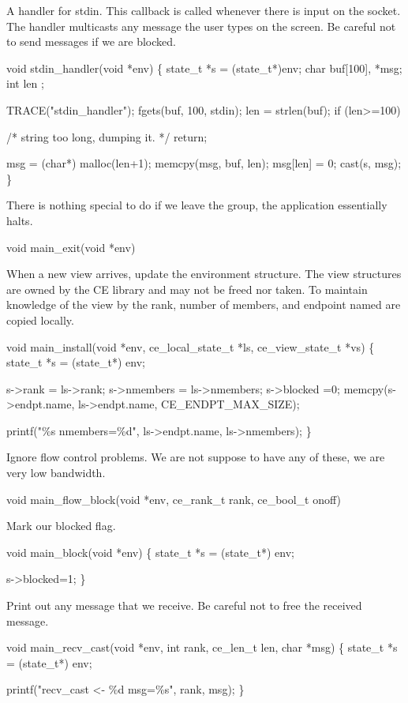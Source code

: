 A handler for stdin. This callback is called whenever there is input
on the socket. The handler multicasts any message the user types on the
screen. Be careful not to send messages if we are blocked.
\begin{codebox}
void
stdin_handler(void *env)
\{
    state_t *s = (state_t*)env;
    char buf[100], *msg;
    int len ;
    
    TRACE("stdin_handler");
    fgets(buf, 100, stdin);
    len = strlen(buf);
    if (len>=100)
    
    /* string too long, dumping it.
     */
    return;

    msg = (char*) malloc(len+1);
    memcpy(msg, buf, len);
    msg[len] = 0;
    cast(s, msg);
\}
\end{codebox}


There is nothing special to do if we leave the group, the application
essentially halts.
\begin{codebox}
void main_exit(void *env){}
\end{codebox}

When a new view arrives, update the environment structure. The view
structures are owned by the CE library and may not be freed nor taken. To
maintain knowledge of the view by the rank, number of members, and
endpoint named are copied locally. 
\begin{codebox}
void main_install(void *env, ce_local_state_t *ls, ce_view_state_t *vs) 
\{
    state_t *s = (state_t*) env;
    
    s->rank = ls->rank;
    s->nmembers = ls->nmembers;
    s->blocked =0;
    memcpy(s->endpt.name, ls->endpt.name, CE\_ENDPT\_MAX\_SIZE);

    printf("\%s nmembers=\%d", ls->endpt.name, ls->nmembers);
\}
\end{codebox}

Ignore flow control problems. We are not suppose to have any of 
these, we are very low bandwidth.
\begin{codebox}
void main_flow_block(void *env, ce_rank_t rank, ce_bool_t onoff){}
\end{codebox}

Mark our blocked flag. 
\begin{codebox}
void main_block(void *env) \{
  state_t *s = (state_t*) env;

  s->blocked=1;
\}
\end{codebox}

Print out any message that we receive. Be careful not to free the
received message.
\begin{codebox}
void main_recv_cast(void *env, int rank, ce_len_t len, char *msg) \{
  state_t *s = (state_t*) env;

  printf("recv_cast <- \%d msg=\%s", rank, msg);
\}
\end{codebox}

